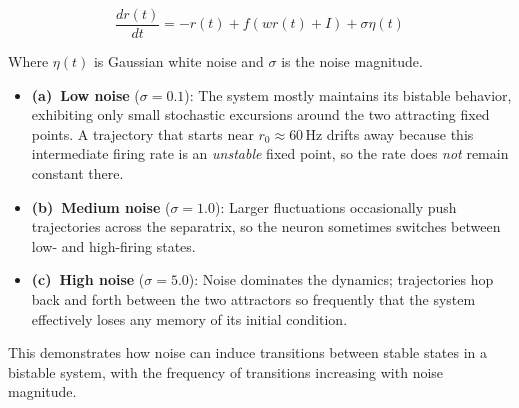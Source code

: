 \documentclass{article}
\begin{document}
\begin{equation}
\frac{dr(t)}{dt} = -r(t) + f(wr(t) + I) + \sigma\eta(t)
\end{equation}

Where $\eta(t)$ is Gaussian white noise and $\sigma$ is the noise magnitude.

\begin{itemize}
    \item \textbf{(a)~Low noise} ($\sigma = 0.1$): The system mostly maintains its bistable behavior, exhibiting only small stochastic excursions around the two attracting fixed points.  A trajectory that starts near $r_0 \!\approx\! 60\,$Hz drifts away because this intermediate firing rate is an \emph{unstable} fixed point, so the rate does \emph{not} remain constant there. 
    \item \textbf{(b)~Medium noise} ($\sigma = 1.0$): Larger fluctuations occasionally push trajectories across the separatrix, so the neuron sometimes switches between low- and high-firing states.
    \item \textbf{(c)~High noise} ($\sigma = 5.0$): Noise dominates the dynamics; trajectories hop back and forth between the two attractors so frequently that the system effectively loses any memory of its initial condition.
\end{itemize}

This demonstrates how noise can induce transitions between stable states in a bistable system, with the frequency of transitions increasing with noise magnitude.
\end{document}
